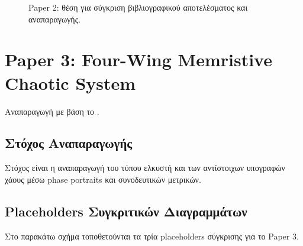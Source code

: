 \documentclass[11pt,a4paper]{report}
\begin{document}
\begin{figure}[H]
\centering
\begin{subfigure}[t]{0.31\textwidth}
\centering
{}
\end{subfigure}
\hfill
\begin{subfigure}[t]{0.31\textwidth}
\centering
{}
\end{subfigure}
\hfill
\begin{subfigure}[t]{0.31\textwidth}
\centering
{}
\end{subfigure}
\caption{Paper 2: θέση για σύγκριση βιβλιογραφικού αποτελέσματος και αναπαραγωγής.}
\label{fig:ch3-paper2-placeholder}
\end{figure}

\section{Paper 3: Four-Wing Memristive Chaotic System}

Αναπαραγωγή με βάση το \cite{pham2016_hyperjerk_memristive}.

\subsection{Στόχος Αναπαραγωγής}

Στόχος είναι η αναπαραγωγή του τύπου ελκυστή και των αντίστοιχων υπογραφών χάους μέσω phase portraits και συνοδευτικών μετρικών.

\subsection{Placeholders Συγκριτικών Διαγραμμάτων}

Στο παρακάτω σχήμα τοποθετούνται τα τρία placeholders σύγκρισης για το Paper 3.
\end{document}
